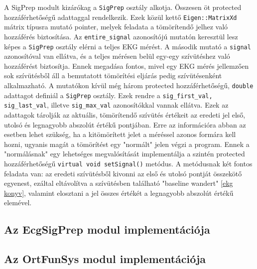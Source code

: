 \documentclass[oneside,titlepage,12pt,a4paper]{report}
\begin{document}
\par A SigPrep modult kizárókag a \texttt{SigPrep} osztály alkotja. Összesen öt protected hozzáférhetőségű adattaggal rendelkezik. Ezek közül kettő \texttt{Eigen::MatrixXd} mátrix típusra mutató pointer, melyek feladata a tömörítendő jelhez való hozzáférés biztosítása. Az \texttt{entire_signal} azonosítójú mutatón keresztül lesz képes a \texttt{SigPrep} osztály elérni a teljes EKG mérést. A második mutató a \texttt{signal} azonosítóval van ellátva, és a teljes mérésen belül egy-egy szívütéshez való hozzáférést biztosítja. Ennek megadása fontos, mivel egy EKG mérés jellemzően sok szívütésből áll a bemutatott tömörítési eljárás pedig szívütésenként alkalmazható. A mutatókon kívül még három protected hozzáférhetőségű, \texttt{double} adattagot definiál a \texttt{SigPrep} osztály. Ezek rendre a \texttt{sig_first_val, sig_last_val}, illetve \texttt{sig_max_val} azonosítókkal vannak ellátva. Ezek az adattagok tárolják az aktuális, tömörítendő szívütés értékeit az eredeti jel első, utolsó és legnagyobb abszolút értékű pontjában. Erre az információra abban az esetben lehet szükség, ha a kitömörített jelet a méréssel azonos formára kell hozni, ugyanis magát a tömörítést egy "normált" jelen végzi a program. Ennek a "normálásnak" egy lehetséges megvalósítását implementálja a szintén protected hozzáférhetőségű \texttt{virtual void setSignal()} metódus. A metódusnak két fontos feladata van: az eredeti szívütésből kivonni az első és utolsó pontját összekötő egyenest, ezáltal eltávolítva a szívütésben található "baseline wandert" \ref{ekg konyv}, valamint elosztani a jel összes értékét a legnagyobb abszolút értékű elemével.   


\subsection{Az EcgSigPrep modul implementációja}

\subsection{Az OrtFunSys modul implementációja}
\end{document}
